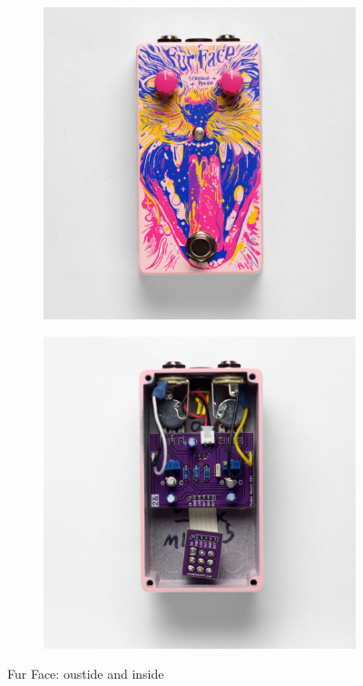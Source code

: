 \documentclass[a4paper,12pt]{article}
\begin{document}
\begin{figure}[h!]
  \centering
  \begin{subfigure}[b]{0.49\textwidth}
    \centering
    \includegraphics[width=\textwidth]{fur-face-front-1000.jpg}
  \end{subfigure}
  \begin{subfigure}[b]{0.49\textwidth}
    \centering
    \includegraphics[width=\textwidth]{fur-face-inside-1000.jpg}
  \end{subfigure}
  \caption{Fur Face: oustide and inside}
  \label{fig:FurFace}
\end{figure}
\end{document}
